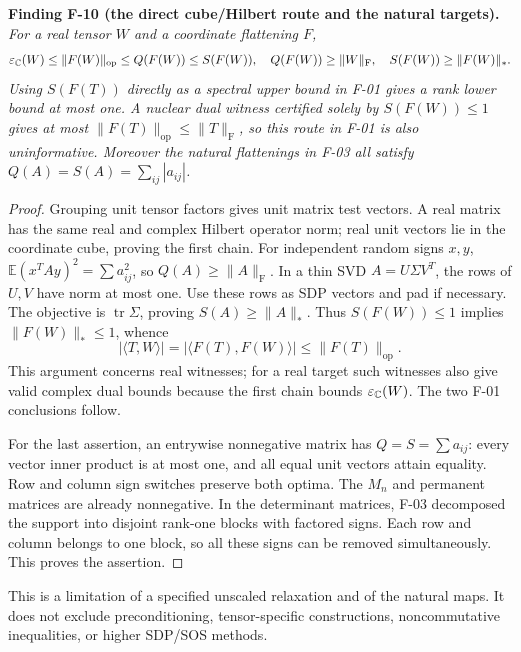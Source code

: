 \documentclass[11pt]{article}
\newcommand{\HS}[1]{\lVert #1\rVert_{\mathrm F}}
\newcommand{\op}[1]{\lVert #1\rVert_{\mathrm{op}}}
\newcommand{\nuc}[1]{\lVert #1\rVert_*}
\newcommand{\eps}{\varepsilon}
\newcommand{\tr}{\operatorname{tr}}\newcommand{\id}{\operatorname{id}}
\newenvironment{finding}[2]{\par\medskip\noindent\textbf{Finding #1 (#2).}\ \itshape}{\par\medskip}
\begin{document}
\begin{finding}{F-10}{the direct cube/Hilbert route and the natural targets}
For a real tensor $W$ and a coordinate flattening $F$,
\[
 \eps_\C(W)\leq\op{F(W)}\leq Q(F(W))\leq S(F(W)),
 \quad Q(F(W))\geq\HS W,\quad S(F(W))\geq\nuc{F(W)}.
\]
Using $S(F(T))$ directly as a spectral upper bound in F-01 gives
a rank lower bound at most one. A nuclear dual witness certified
solely by $S(F(W))\leq1$ gives at most $\op{F(T)}\leq\HS T$,
so this route in F-01 is also uninformative.
Moreover the natural flattenings in F-03 all satisfy
$Q(A)=S(A)=\sum_{ij}|a_{ij}|$.
\end{finding}
\begin{proof}
Grouping unit tensor factors gives unit matrix test vectors.
A real matrix has the same real and complex Hilbert operator norm;
real unit vectors lie in the coordinate cube, proving the first chain.
For independent random signs $x,y$,
$\mathbb E(x^TAy)^2=\sum a_{ij}^2$, so $Q(A)\geq\HS A$.
In a thin SVD $A=U\Sigma V^T$, the rows of $U,V$ have norm at most
one. Use these rows as SDP vectors and pad if necessary.
The objective is $\tr\Sigma$, proving $S(A)\geq\nuc A$.
Thus $S(F(W))\leq1$ implies $\nuc{F(W)}\leq1$, whence
\[
 |\langle T,W\rangle|
 =|\langle F(T),F(W)\rangle|\leq\op{F(T)}.
\]
This argument concerns real witnesses; for a real target such
witnesses also give valid complex dual bounds because the first
chain bounds $\eps_\C(W)$. The two F-01 conclusions follow.

For the last assertion, an entrywise nonnegative matrix has
$Q=S=\sum a_{ij}$: every vector inner product is at most one,
and all equal unit vectors attain equality. Row and column sign
switches preserve both optima. The $M_n$ and permanent matrices are
already nonnegative. In the determinant matrices, F-03 decomposed
the support into disjoint rank-one blocks with factored signs.
Each row and column belongs to one block, so all these signs can
be removed simultaneously. This proves the assertion.
\end{proof}
This is a limitation of a specified unscaled relaxation and of the
natural maps. It does not exclude preconditioning, tensor-specific
constructions, noncommutative inequalities, or higher SDP/SOS methods.
\end{document}
